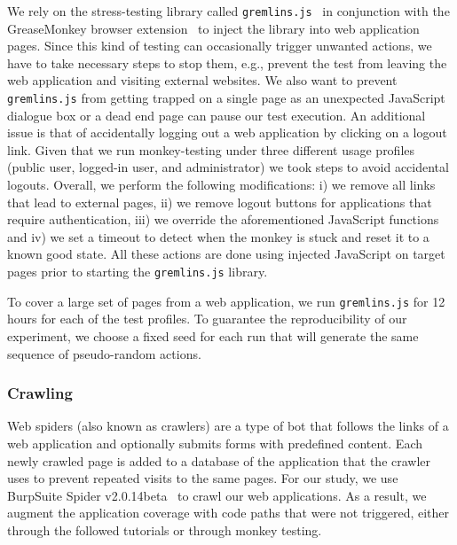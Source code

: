 We rely on the stress-testing library called
\texttt{gremlins.js}~\cite{gremlinsjs} in conjunction with the GreaseMonkey
browser extension~\cite{greasemonkey} to inject the library into web
application pages.
Since this kind of testing can occasionally trigger unwanted actions, we have
to take necessary steps to stop them, e.g., prevent the test from leaving
the web application and visiting external websites. We also want to prevent
\texttt{gremlins.js} from getting trapped on a single page as an unexpected
JavaScript
dialogue box or a dead end page can pause our test
execution.  %
An additional issue is that of accidentally logging out a web application by
clicking on a logout link. Given that we run monkey-testing under three different
usage profiles (public user, logged-in user, and administrator) we took steps
to avoid accidental logouts. Overall, we perform the following
modifications: i) we remove all links that lead to external pages, ii) we
remove logout buttons for applications that require authentication, iii) we
override the aforementioned JavaScript functions and iv) we set a timeout to
detect when the monkey is stuck and reset it to a known good state. All these
actions are done using injected JavaScript on target pages prior to starting
the \texttt{gremlins.js} library.

To cover a large set of pages from a web application, we run
\texttt{gremlins.js} for 12 hours for each of the test profiles.
To guarantee the reproducibility of our experiment, we choose a fixed seed for
each run that will generate the same sequence of pseudo-random actions.


\subsubsection{Crawling}
Web spiders (also known as crawlers) are a type of bot that follows the
links of a web application and optionally submits forms with predefined
content. Each newly crawled page is added to a database of the application that
the crawler uses to prevent repeated visits to the same pages. For our study,
we use BurpSuite Spider v2.0.14beta~\cite{burpsuite} to crawl our web
applications. As a result, we augment the application coverage with code paths that were
not triggered, either through the followed tutorials or through monkey testing.

